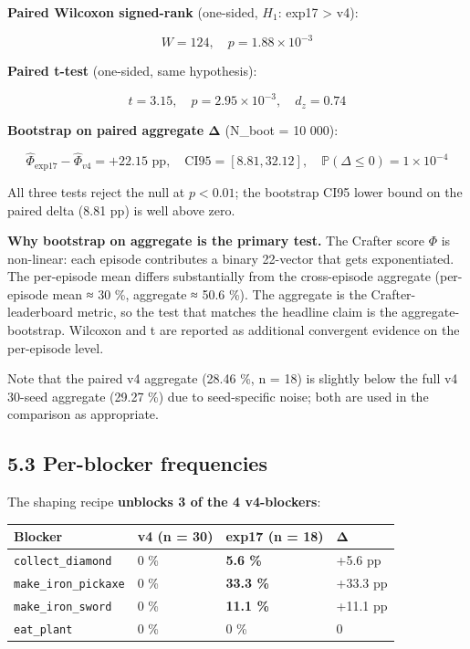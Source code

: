 \textbf{Paired Wilcoxon signed-rank} (one-sided, $H_1$: exp17 > v4):

\[
W = 124, \quad p = 1.88 \times 10^{-3}
\]

\textbf{Paired t-test} (one-sided, same hypothesis):

\[
t = 3.15, \quad p = 2.95 \times 10^{-3}, \quad d_z = 0.74
\]

\textbf{Bootstrap on paired aggregate Δ} (N\_boot = 10 000):

\[
\widehat{\Phi}_{\text{exp17}} - \widehat{\Phi}_{v4} = +22.15 \text{ pp}, \quad
\text{CI95} = [8.81, 32.12], \quad \mathbb{P}(\Delta \le 0) = 1 \times 10^{-4}
\]

All three tests reject the null at $p < 0.01$; the bootstrap CI95 lower
bound on the paired delta (8.81 pp) is well above zero.

\textbf{Why bootstrap on aggregate is the primary test.} The Crafter score
$\Phi$ is non-linear: each episode contributes a binary 22-vector that
gets exponentiated. The per-episode mean differs substantially from
the cross-episode aggregate (per-episode mean ≈ 30 \%, aggregate
≈ 50.6 \%). The aggregate is the Crafter-leaderboard metric, so the
test that matches the headline claim is the aggregate-bootstrap.
Wilcoxon and t are reported as additional convergent evidence on the
per-episode level.

Note that the paired v4 aggregate (28.46 \%, n = 18) is slightly below
the full v4 30-seed aggregate (29.27 \%) due to seed-specific noise;
both are used in the comparison as appropriate.

\subsection{5.3 Per-blocker frequencies}

The shaping recipe \textbf{unblocks 3 of the 4 v4-blockers}:

\begin{tabular}{l l l l}
\toprule
Blocker & v4 (n = 30) & exp17 (n = 18) & Δ \\
\midrule
\texttt{collect\_diamond} & 0 \% & \textbf{5.6 \%} & +5.6 pp \\
\texttt{make\_iron\_pickaxe} & 0 \% & \textbf{33.3 \%} & +33.3 pp \\
\texttt{make\_iron\_sword} & 0 \% & \textbf{11.1 \%} & +11.1 pp \\
\texttt{eat\_plant} & 0 \% & 0 \% & 0 \\
\bottomrule
\end{tabular}

